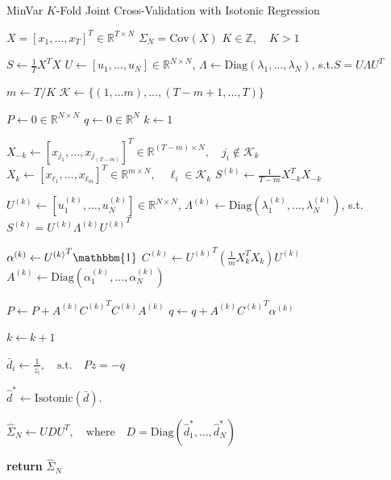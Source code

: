 \documentclass{article}
\begin{document}
\begin{algorithm}
	\caption{MinVar $K$-Fold Joint Cross-Validation with Isotonic Regression}
	\label{alg:minvar_kfold_joint_cv}
	\begin{algorithmic}[1]
	\Require $X = [x_1, \ldots, x_T]^T \in \mathbb{R}^{T\times N}$
	\Require $\Sigma_N = \mathrm{Cov}(X)$
	\Require $K \in \mathbb{Z}, \quad K > 1$

		\State $S \gets \frac1T X^T X$
		\State 
				$U \gets [u_1, \ldots, u_N] \in \mathbb{R}^{N\times N}$,
				\quad $\Lambda \gets \mathrm{Diag}(\lambda_1, \ldots, \lambda_N)$,
				\quad \mbox{s.t.}\quad $S = U \Lambda {U}^T$

		\State $m \gets T / K$
		\State $\mathcal{K} \gets \{(1, \ldots m), \ldots, (T-m+1, \ldots, T)\}$

		\State $P \gets 0 \in \mathbb{R}^{N \times N}$
		\State $q \gets 0 \in \mathbb{R}^{N}$
		\State $k \gets 1$

			\State $X_{-k} \gets [x_{j_1}, \ldots, x_{j_{(T-m)}}]^T \in \mathbb{R}^{(T-m)\times N}, 
				\quad j_i \notin \mathcal{K}_k$
			\State $X_{k} \gets [x_{\ell_1}, \ldots, x_{\ell_m}]^T \in \mathbb{R}^{m\times N}, 
				\quad \ell_i \in \mathcal{K}_k$
			\State $S^{(k)} \gets \frac{1}{T-m} X_{-k}^T X_{-k} $

			\State 
				$U^{(k)} \gets [u^{(k)}_1, \ldots, u^{(k)}_N] \in \mathbb{R}^{N\times N}$,
				\quad $\Lambda^{(k)} 
					\gets \mathrm{Diag}(\lambda^{(k)}_1, \ldots, \lambda^{(k)}_N)$,
				\quad \mbox{s.t.}\quad $S^{(k)} = U^{(k)} \Lambda^{(k)} {U^{(k)}}^T$

			\State $\alpha^{(k)} \gets {U^{(k)}}^T\mathbbm{1}$
			\State $C^{(k)} \gets {U^{(k)}}^T (\frac1m X_{k}^T X_{k}) U^{(k)}$
			\State $A^{(k)} \gets \mathrm{Diag}(\alpha^{(k)}_1, \ldots, \alpha^{(k)}_N)$

			\State $P \gets P +  A^{(k)} {C^{(k)}}^T C^{(k)} A^{(k)}$
			\State $q \gets q + A^{(k)} {C^{(k)}}^T \alpha^{(k)}$

			\State $k \gets k+1$

		\EndWhile

		\State $\bar{d}_i \gets \frac{1}{z_i}, \quad \mbox{s.t.} \quad Pz = -q$

		\State $\hat{d}^* \gets \mathrm{Isotonic}(\bar{d}).$ 

		\State $\hat{\Sigma}_N \gets UDU^T, \quad 
			\mbox{where}\quad D = \mathrm{Diag}(\hat{d}^*_1, \ldots, \hat{d}^*_N)$

		\State \textbf{return} $\hat{\Sigma}_N$ 
	\EndProcedure
	\end{algorithmic}
\end{algorithm}




\end{document}
